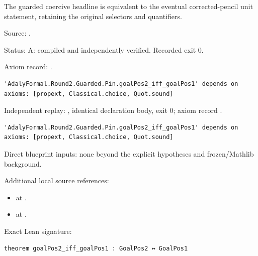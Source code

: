 \begin{theorem}[bp-006]
\label{bp-006}
\uses{}
\leanok
The guarded coercive headline is equivalent to the eventual corrected-pencil unit statement, retaining the original selectors and quantifiers.

\par Source: \texttt{}.
\par Status: A: compiled and independently verified. Recorded exit 0.
\par Axiom record: \texttt{}.
\begin{verbatim}
'AdalyFormal.Round2.Guarded.Pin.goalPos2_iff_goalPos1' depends on axioms: [propext, Classical.choice, Quot.sound]
\end{verbatim}
\par Independent replay: \texttt{}, identical declaration body, exit 0; axiom record \texttt{}.
\begin{verbatim}
'AdalyFormal.Round2.Guarded.Pin.goalPos2_iff_goalPos1' depends on axioms: [propext, Classical.choice, Quot.sound]
\end{verbatim}
\par Direct blueprint inputs: none beyond the explicit hypotheses and frozen/Mathlib background.
\par Additional local source references:
\begin{itemize}
\item \texttt{} at \texttt{}.
\item \texttt{} at \texttt{}.
\end{itemize}
\par Exact Lean signature:
\begin{verbatim}
theorem goalPos2_iff_goalPos1 : GoalPos2 ↔ GoalPos1
\end{verbatim}
\end{theorem}

